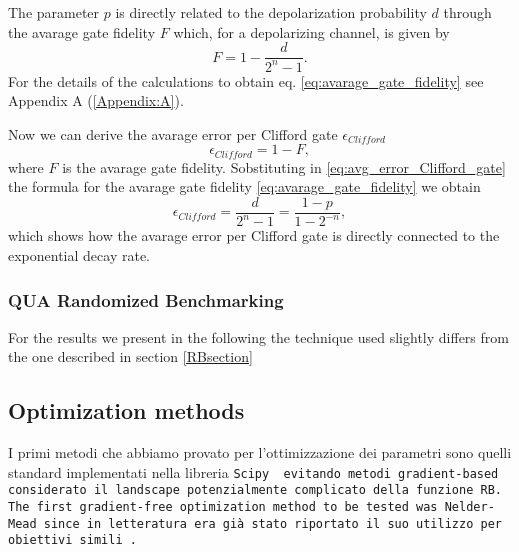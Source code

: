 \begin{comment}
    The exponential form arises from modeling each gate application as an independent error process. When you compose multiple noisy gates, their error contributions multiply, leading naturally to an exponential decay.
\end{comment}    

The parameter $p$ is directly related to the depolarization probability $d$ through the avarage gate fidelity $F$ which, for a depolarizing channel, is given by \begin{equation}
    F = 1 - \frac{d}{2^n - 1}\label{eq:avarage_gate_fidelity}.
\end{equation}
For the details of the calculations to obtain eq. \ref{eq:avarage_gate_fidelity} see Appendix A (\ref{Appendix:A}).

Now we can derive the avarage error per Clifford gate $\epsilon_{Clifford}$ \begin{equation}
    \epsilon_{Clifford} = 1 - F \label{eq:avg_error_Clifford_gate},
\end{equation}
where $F$ is the avarage gate fidelity. Sobstituting in \ref{eq:avg_error_Clifford_gate} the formula for the avarage gate fidelity \ref{eq:avarage_gate_fidelity} we obtain \begin{equation}
    \epsilon_{Clifford} = \frac{d}{2^n -1} = \frac{1-p}{1-2^{-n}},
\end{equation}
which shows how the avarage error per Clifford gate is directly connected to the exponential decay rate.

\subsubsection{QUA Randomized Benchmarking}
For the results we present in the following the technique used slightly differs from the one described in section \ref{RBsection} 

\subsection{Optimization methods}\label{Sec:OptimizationMethods}
I primi metodi che abbiamo provato per l'ottimizzazione dei parametri sono quelli standard implementati nella libreria \tt{Scipy} \cite{SciPy-NMeth} evitando metodi gradient-based considerato il landscape potenzialmente complicato della funzione RB.
The first gradient-free optimization method to be tested was Nelder-Mead since in letteratura era già stato riportato il suo utilizzo per obiettivi simili \cite{kelly_optimal_2014}.

